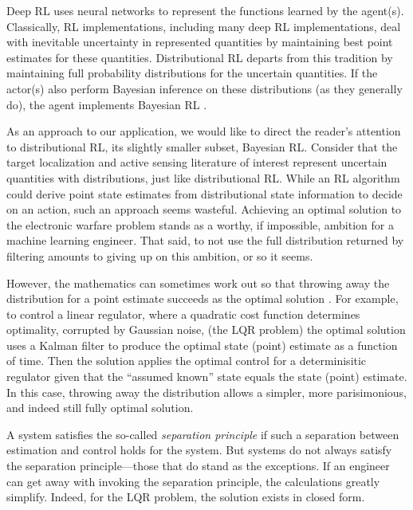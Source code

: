 \documentclass{article}
\begin{document}
Deep RL \cite{li2017deep} uses neural networks to represent the
functions learned by the agent(s).  Classically, RL implementations,
including many deep RL implementations, deal with inevitable
uncertainty in represented quantities by maintaining best point
estimates for these quantities.  Distributional RL
\cite{osband2018randomized} departs from this tradition by maintaining
full probability distributions for the uncertain quantities. If the
actor(s) also perform Bayesian inference on these distributions (as
they generally do), the agent implements Bayesian RL
\cite{ghavamzadeh2016bayesian}.

As an approach to our application, we would like to direct the
reader's attention to distributional RL, its slightly smaller subset,
Bayesian RL.  Consider that the target localization and active sensing
literature of interest represent uncertain quantities with
distributions, just like distributional RL.  While an RL algorithm
could derive point state estimates from distributional state
information to decide on an action, such an approach seems wasteful.
Achieving an optimal solution to the electronic warfare problem stands
as a worthy, if impossible, ambition for a machine learning engineer.
That said, to not use the full distribution returned by filtering
amounts to giving up on this ambition, or so it seems.

However, the mathematics can sometimes work out so that throwing away
the distribution for a point estimate succeeds as the optimal solution
\cite{aastrom2012introduction}.  For example, to control a linear
regulator, where a quadratic cost function determines optimality,
corrupted by Gaussian noise, (the LQR problem) the optimal solution
uses a Kalman filter to produce the optimal state (point) estimate as
a function of time.  Then the solution applies the optimal control for
a determinisitic regulator given that the ``assumed known'' state
equals the state (point) estimate.  In this case, throwing away the
distribution allows a simpler, more parisimonious, and indeed still
fully optimal solution.

A system satisfies the so-called \emph{separation principle} if such a
separation between estimation and control holds for the system.  But
systems do not always satisfy the separation principle---those that do
stand as the exceptions.  If an engineer can get away with invoking
the separation principle, the calculations greatly simplify.  Indeed,
for the LQR problem, the solution exists in closed form.
\end{document}
